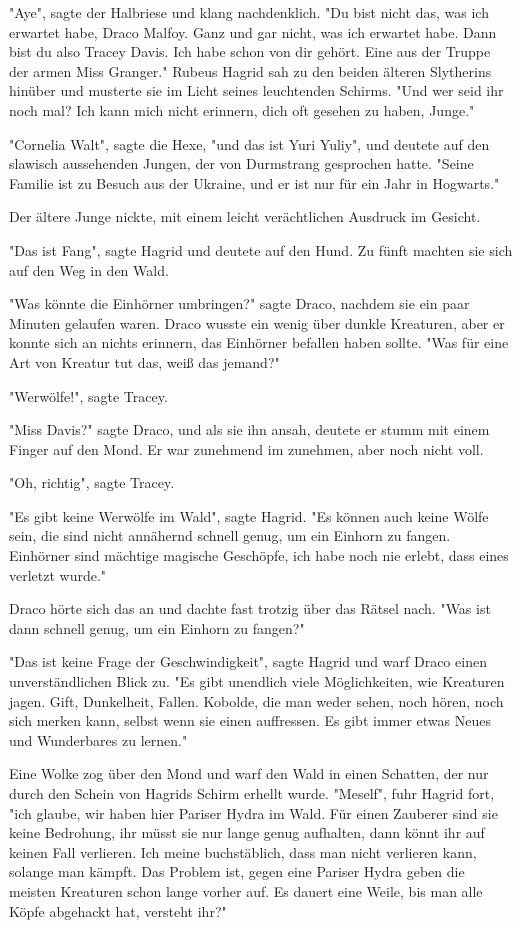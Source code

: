 {"Aye", sagte der Halbriese und klang nachdenklich. "Du bist nicht das, was ich erwartet habe, Draco Malfoy. Ganz und gar nicht, was ich erwartet habe. Dann bist du also Tracey Davis. Ich habe schon von dir gehört. Eine aus der Truppe der armen Miss Granger." Rubeus Hagrid sah zu den beiden älteren Slytherins hinüber und musterte sie im Licht seines leuchtenden Schirms. "Und wer seid ihr noch mal? Ich kann mich nicht erinnern, dich oft gesehen zu haben, Junge."

"Cornelia Walt", sagte die Hexe, "und das ist Yuri Yuliy", und deutete auf den slawisch aussehenden Jungen, der von Durmstrang gesprochen hatte. "Seine Familie ist zu Besuch aus der Ukraine, und er ist nur für ein Jahr in Hogwarts."

Der ältere Junge nickte, mit einem leicht verächtlichen Ausdruck im Gesicht.

"Das ist Fang", sagte Hagrid und deutete auf den Hund. Zu fünft machten sie sich auf den Weg in den Wald.

"Was könnte die Einhörner umbringen?" sagte Draco, nachdem sie ein paar Minuten gelaufen waren. Draco wusste ein wenig über dunkle Kreaturen, aber er konnte sich an nichts erinnern, das Einhörner befallen haben sollte. "Was für eine Art von Kreatur tut das, weiß das jemand?"

"Werwölfe!", sagte Tracey.

"Miss Davis?" sagte Draco, und als sie ihn ansah, deutete er stumm mit einem Finger auf den Mond. Er war zunehmend im zunehmen, aber noch nicht voll.

"Oh, richtig", sagte Tracey.

"Es gibt keine Werwölfe im Wald", sagte Hagrid. "Es können auch keine Wölfe sein, die sind nicht annähernd schnell genug, um ein Einhorn zu fangen. Einhörner sind mächtige magische Geschöpfe, ich habe noch nie erlebt, dass eines verletzt wurde."

Draco hörte sich das an und dachte fast trotzig über das Rätsel nach. "Was ist dann schnell genug, um ein Einhorn zu fangen?"

"Das ist keine Frage der Geschwindigkeit", sagte Hagrid und warf Draco einen unverständlichen Blick zu. "Es gibt unendlich viele Möglichkeiten, wie Kreaturen jagen. Gift, Dunkelheit, Fallen. Kobolde, die man weder sehen, noch hören, noch sich merken kann, selbst wenn sie einen auffressen. Es gibt immer etwas Neues und Wunderbares zu lernen."

Eine Wolke zog über den Mond und warf den Wald in einen Schatten, der nur durch den Schein von Hagrids Schirm erhellt wurde. "Meself", fuhr Hagrid fort, "ich glaube, wir haben hier Pariser Hydra im Wald. Für einen Zauberer sind sie keine Bedrohung, ihr müsst sie nur lange genug aufhalten, dann könnt ihr auf keinen Fall verlieren. Ich meine buchstäblich, dass man nicht verlieren kann, solange man kämpft. Das Problem ist, gegen eine Pariser Hydra geben die meisten Kreaturen schon lange vorher auf. Es dauert eine Weile, bis man alle Köpfe abgehackt hat, versteht ihr?"

}
